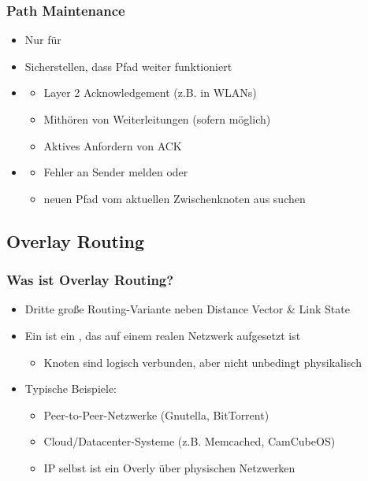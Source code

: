 \subsubsection*{Path Maintenance}
\begin{itemize}
    \item Nur für 
    \item {} Sicherstellen, dass Pfad weiter funktioniert
    \item {}
    \begin{itemize}
        \item Layer 2 Acknowledgement (z.B. in WLANs)
        \item Mithören von Weiterleitungen (sofern möglich)
        \item Aktives Anfordern von ACK
    \end{itemize}
    \item {}
    \begin{itemize}
        \item Fehler an Sender melden oder 
        \item neuen Pfad vom aktuellen Zwischenknoten aus suchen
    \end{itemize}
\end{itemize}
\subsection{Overlay Routing}
\subsubsection*{Was ist Overlay Routing?}
\begin{itemize}
    \item Dritte große Routing-Variante neben Distance Vector \& Link State
    \item Ein  ist ein , das auf einem realen Netzwerk aufgesetzt ist
    \begin{itemize}
        \item Knoten sind logisch verbunden, aber nicht unbedingt physikalisch
    \end{itemize}
    \item Typische Beispiele:
    \begin{itemize}
        \item Peer-to-Peer-Netzwerke (Gnutella, BitTorrent)
        \item Cloud/Datacenter-Systeme (z.B. Memcached, CamCubeOS)
        \item IP selbst ist ein Overly über physischen Netzwerken
    \end{itemize}
\end{itemize}
